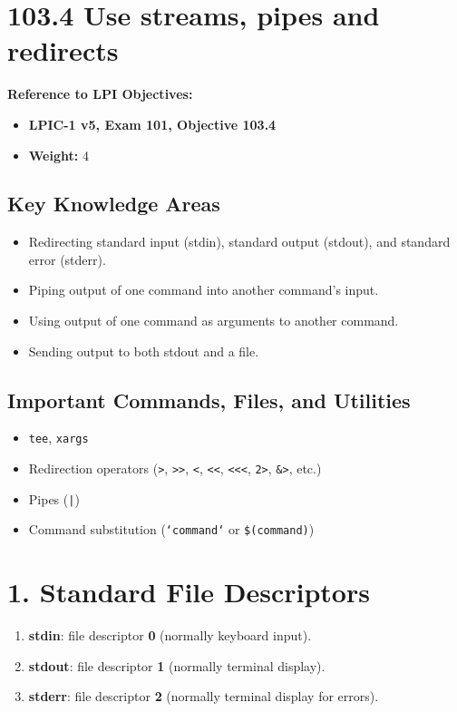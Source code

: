 \documentclass[a4paper]{report}
\begin{document}
\section*{103.4 Use streams, pipes and redirects}

\textbf{Reference to LPI Objectives:}  
\begin{itemize}
    \item \textbf{LPIC-1 v5, Exam 101, Objective 103.4}  
    \item \textbf{Weight:} 4  
\end{itemize}

\subsection*{Key Knowledge Areas}
\begin{itemize}
    \item Redirecting standard input (stdin), standard output (stdout), and standard error (stderr).  
    \item Piping output of one command into another command’s input.  
    \item Using output of one command as arguments to another command.  
    \item Sending output to both stdout and a file.
\end{itemize}

\subsection*{Important Commands, Files, and Utilities}
\begin{itemize}
    \item \texttt{tee}, \texttt{xargs}  
    \item Redirection operators (\texttt{>}, \texttt{>>}, \texttt{<}, \texttt{<<}, \texttt{<<<}, \texttt{2>}, \texttt{\&>}, etc.)  
    \item Pipes (\texttt{|})  
    \item Command substitution (\texttt{`command`} or \texttt{\$(command)})
\end{itemize}

\section*{1. Standard File Descriptors}
\begin{enumerate}
    \item \textbf{stdin}: file descriptor \textbf{0} (normally keyboard input).  
    \item \textbf{stdout}: file descriptor \textbf{1} (normally terminal display).  
    \item \textbf{stderr}: file descriptor \textbf{2} (normally terminal display for errors).
\end{enumerate}
\end{document}
